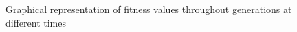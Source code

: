 \documentclass[a4paper,10pt]{article}
\begin{document}
\begin{figure}
  \centering
  \caption{Graphical representation of fitness values throughout generations at different times}
  \label{fig:firstResults}
\end{figure}




























  
\end{document}
